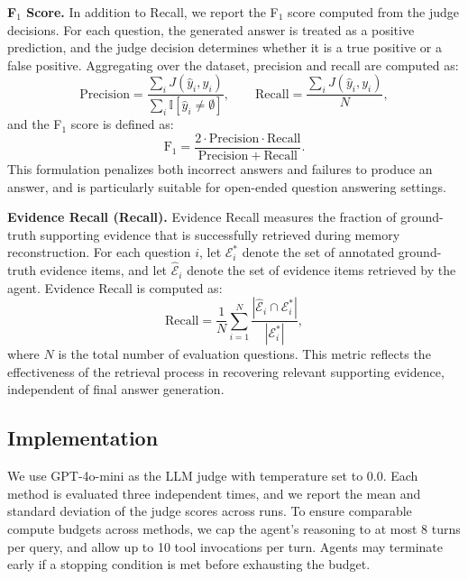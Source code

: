 \documentclass{llmxive}
\begin{document}
\textbf{F$_1$ Score.}
In addition to Recall, we report the F$_1$ score computed from the judge decisions.
For each question, the generated answer is treated as a positive prediction, and the judge decision determines whether it is a true positive or a false positive.
Aggregating over the dataset, precision and recall are computed as:
\begin{equation}
\mathrm{Precision}
=
\frac{\sum_i J(\hat{y}_i, y_i)}{\sum_i \mathbb{I}[\hat{y}_i \neq \emptyset]},
\qquad
\mathrm{Recall}
=
\frac{\sum_i J(\hat{y}_i, y_i)}{N},
\end{equation}
and the F$_1$ score is defined as:
\begin{equation}
\mathrm{F}_1
=
\frac{2 \cdot \mathrm{Precision} \cdot \mathrm{Recall}}
{\mathrm{Precision} + \mathrm{Recall}}.
\end{equation}
This formulation penalizes both incorrect answers and failures to produce an answer, and is particularly suitable for open-ended question answering settings.


\textbf{Evidence Recall (Recall).}
Evidence Recall measures the fraction of ground-truth supporting evidence that is successfully retrieved during memory reconstruction.
For each question $i$, let $\mathcal{E}_i^{\ast}$ denote the set of annotated ground-truth evidence items, and let $\hat{\mathcal{E}}_i$ denote the set of evidence items retrieved by the agent.
Evidence Recall is computed as:
\begin{equation}
\mathrm{Recall}
=
\frac{1}{N}
\sum_{i=1}^{N}
\frac{|\hat{\mathcal{E}}_i \cap \mathcal{E}_i^{\ast}|}
{|\mathcal{E}_i^{\ast}|},
\end{equation}
where $N$ is the total number of evaluation questions.
This metric reflects the effectiveness of the retrieval process in recovering relevant supporting evidence, independent of final answer generation.


\subsection{Implementation}
We use GPT-4o-mini as the LLM judge with temperature set to 0.0. Each method is evaluated three independent times, and we report the mean and standard deviation of the judge scores across runs.
To ensure comparable compute budgets across methods, we cap the agent’s reasoning to at most 8 turns per query, and allow up to 10 tool invocations per turn. Agents may terminate early if a stopping condition is met before exhausting the budget.
\end{document}
